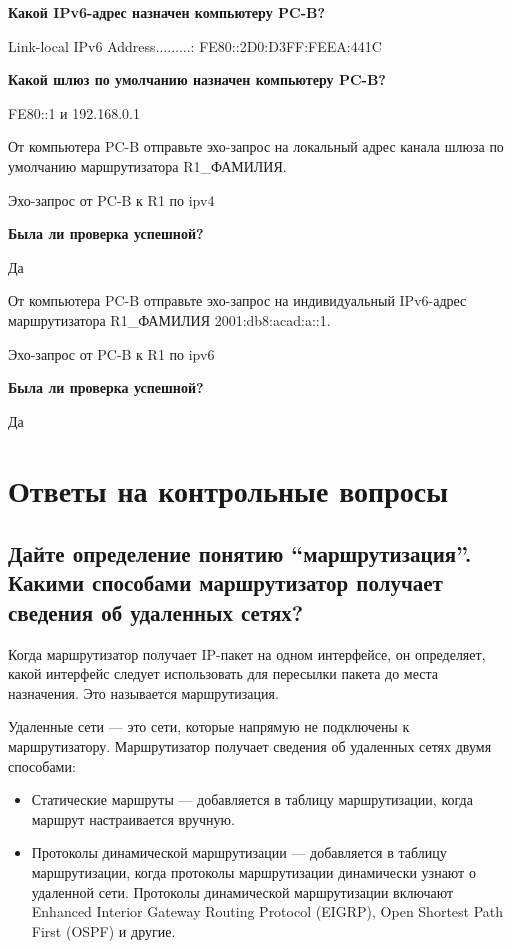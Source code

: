\textbf{Какой IPv6-адрес назначен компьютеру PC-B?}

Link-local IPv6 Address.........: FE80::2D0:D3FF:FEEA:441C

\textbf{Какой шлюз по умолчанию назначен компьютеру PC-B?}

FE80::1 и 192.168.0.1

От компьютера PC-B отправьте эхо-запрос на локальный адрес
канала шлюза по умолчанию маршрутизатора R1\_ФАМИЛИЯ.

\begin{image}
	\caption{Эхо-запрос от PC-B к R1 по ipv4}
\end{image}

\textbf{Была ли проверка успешной?}

Да

От компьютера PC-B отправьте эхо-запрос на индивидуальный IPv6-адрес
маршрутизатора R1\_ФАМИЛИЯ 2001:db8:acad:a::1.

\begin{image}
	\caption{Эхо-запрос от PC-B к R1 по ipv6}
\end{image}


\textbf{Была ли проверка успешной?}

Да

\section{Ответы на контрольные вопросы}

\subsection{Дайте определение понятию “маршрутизация”. Какими 
	способами маршрутизатор получает сведения об удаленных 
	сетях?}

Когда маршрутизатор получает IP-пакет на одном интерфейсе, он 
определяет, какой интерфейс следует использовать для пересылки пакета до 
места назначения. Это называется маршрутизация.\par
Удаленные сети --- это сети, которые напрямую не подключены к 
маршрутизатору. Маршрутизатор получает сведения об удаленных сетях 
двумя способами:

\begin{itemize}
	\item Статические маршруты --- добавляется в таблицу маршрутизации, 
		когда маршрут настраивается вручную.
	\item Протоколы динамической маршрутизации --- добавляется в таблицу 
		маршрутизации, когда протоколы маршрутизации динамически узнают 
		о удаленной сети. Протоколы динамической маршрутизации включают 
		Enhanced Interior Gateway Routing Protocol (EIGRP), Open Shortest Path 
		First (OSPF) и другие.
\end{itemize}


